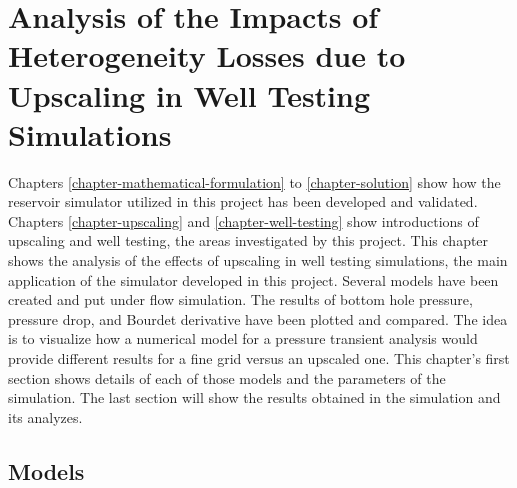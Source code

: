 \chapter{Analysis of the Impacts of Heterogeneity Losses due to Upscaling in Well Testing Simulations}
\label{chapter-AIHLUWTS}

Chapters \ref{chapter-mathematical-formulation} to \ref{chapter-solution} show how the reservoir simulator utilized in this project has been developed and validated.
%
Chapters \ref{chapter-upscaling} and \ref{chapter-well-testing} show introductions of upscaling and well testing, the areas investigated by this project.
%
This chapter shows the analysis of the effects of upscaling in well testing simulations, the main application of the simulator developed in this project.
%
Several models have been created and put under flow simulation.
%
The results of bottom hole pressure, pressure drop, and Bourdet derivative have been plotted and compared.
%
The idea is to visualize how a numerical model for a pressure transient analysis would provide different results for a fine grid versus an upscaled one.
%
This chapter's first section shows details of each of those models and the parameters of the simulation.
%
The last section will show the results obtained in the simulation and its analyzes.

\section{Models}

